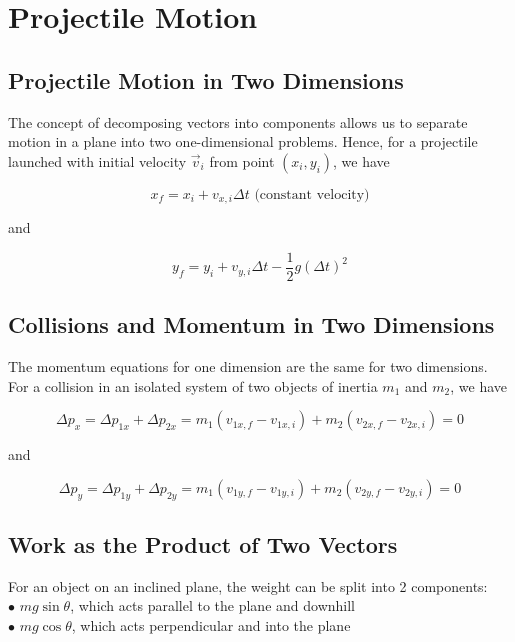 \section{Projectile Motion}

    \subsection{Projectile Motion in Two Dimensions}

        The concept of decomposing vectors into components allows us to separate motion in a plane into two one-dimensional problems. Hence, for a projectile launched with initial velocity $\vec{v}_i$ from point
        $\left(x_i, y_i\right)$, we have

        \[
            x_f = x_i + v_{x,i} \Delta t \text{ (constant velocity)}
        \]

        and

        \[
            y_f = y_i + v_{y,i} \Delta t - \frac{1}{2} g\left(\Delta t\right)^2
        \]



    \subsection{Collisions and Momentum in Two Dimensions}

        The momentum equations for one dimension are the same for two dimensions. For a collision in an isolated system of two objects of inertia $m_1$ and $m_2$, we have

        \[
            \Delta p_x = \Delta p_{1x} + \Delta p_{2x} = m_1(v_{1x,f} - v_{1x,i}) + m_2(v_{2x,f} - v_{2x,i}) = 0
        \]

        and

        \[
            \Delta p_y = \Delta p_{1y} + \Delta p_{2y} = m_1 (v_{1y,f} - v_{1y,i}) + m_2 (v_{2y,f} - v_{2y,i}) = 0
        \]





    \subsection{Work as the Product of Two Vectors}

        For an object on an inclined plane, the weight can be split into 2 components: \\
        $\bullet$ $mg\sin{\theta}$, which acts parallel to the plane and downhill \\
        $\bullet$ $mg\cos{\theta}$, which acts perpendicular and into the plane \\

